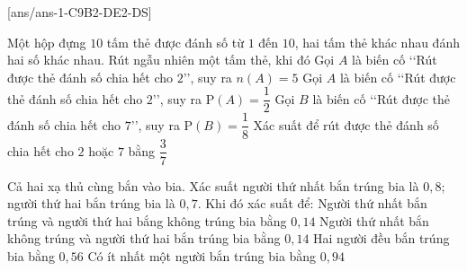 [ans/ans-1-C9B2-DE2-DS]
\cauds

\begin{ex}%
	Một hộp đựng $10$ tấm thẻ được đánh số từ $1$ đến $10$, hai tấm thẻ khác nhau đánh hai số khác nhau. Rút ngẫu nhiên một tấm thẻ, khi đó
	\choiceTF
	{\True Gọi $A$ là biến cố \lq\lq Rút được thẻ đánh số chia hết cho $2$\rq\rq, suy ra $n(A)=5$}
	{\True Gọi $A$ là biến cố \lq\lq Rút được thẻ đánh số chia hết cho $2$\rq\rq, suy ra $\mathrm{P}(A)=\dfrac{1}{2}$}
	{Gọi $B$ là biến cố \lq\lq Rút được thẻ đánh số chia hết cho $7$\rq\rq, suy ra $\mathrm{P}(B)=\dfrac{1}{8}$}
	{Xác suất để rút được thẻ đánh số chia hết cho $2$ hoặc $7$ bằng $\dfrac{3}{7}$}
\end{ex}

\begin{ex}%
	Cả hai xạ thủ cùng bắn vào bia. Xác suất người thứ nhất bắn trúng bia là $0{,}8$; người thứ hai bắn trúng bia là $0{,}7$. Khi đó xác suất để:
	\choiceTF
	{Người thứ nhất bắn trúng và người thứ hai bắng không trúng bia bằng $0{,}14$}
	{\True Người thứ nhất bắn không trúng và người thứ hai bắn trúng bia bằng $0{,}14$}
	{\True Hai người đều bắn trúng bia bằng $0{,}56$}
	{\True Có ít nhất một người bắn trúng bia bằng $0{,}94$}
\end{ex}

